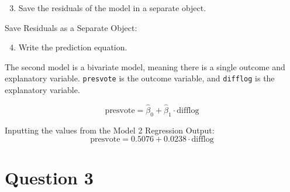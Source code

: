 \documentclass[12pt,letterpaper]{article}
\begin{document}
\noindent\begin{enumerate}[left=0pt]		
\setcounter{enumi}{2} 
		\item Save the residuals of the model in a separate object.
	\end{enumerate}
	
	\noindent Save Residuals as a Separate Object:
	

\newpage		
\noindent\begin{enumerate}[left=0pt]
\setcounter{enumi}{3}		
		\item Write the prediction equation.
	\end{enumerate}
	
\noindent The second model is a bivariate model, meaning there is a single outcome and explanatory variable.  \texttt{presvote} is the outcome variable, and  \texttt{difflog} is the explanatory variable.

\begin{equation}
	\text{presvote} = \hat{\beta}_0 + \hat{\beta}_1 \cdot \text{difflog}
\end{equation}

\vspace{0.5cm} \noindent Inputting the values from the Model 2 Regression Output:
\begin{equation}
	\text{presvote} = 0.5076 + 0.0238 \cdot \text{difflog}
\end{equation}
	
	\newpage	
\section*{Question 3}
\end{document}
